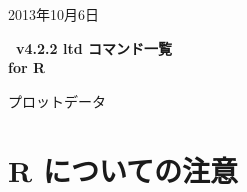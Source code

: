 \documentclass[a4j]{jarticle}
\begin{document}
\begin{flushright}
2013年10月6日
\end{flushright}

\begin{center}
{\bf \huge \ketpic\ v4.2.2 ltd コマンド一覧}\vspace{3mm}\\
{\bf \huge for R}
\end{center}

\hfill
\begin{minipage}{4cm}
プロットデータ\\
\end{minipage}


\section{R についての注意}
\end{document}

